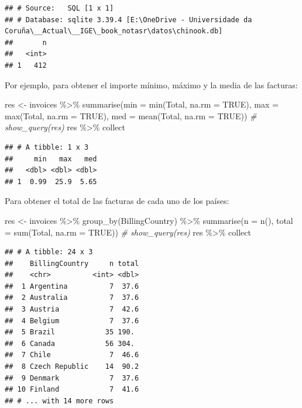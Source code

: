 \documentclass[
]{book}
\newenvironment{Shaded}{\begin{snugshade}}{\end{snugshade}}
\newcommand{\AttributeTok}[1]{\textcolor[rgb]{0.77,0.63,0.00}{#1}}
\newcommand{\CommentTok}[1]{\textcolor[rgb]{0.56,0.35,0.01}{\textit{#1}}}
\newcommand{\ConstantTok}[1]{\textcolor[rgb]{0.00,0.00,0.00}{#1}}
\newcommand{\FunctionTok}[1]{\textcolor[rgb]{0.00,0.00,0.00}{#1}}
\newcommand{\NormalTok}[1]{#1}
\newcommand{\OtherTok}[1]{\textcolor[rgb]{0.56,0.35,0.01}{#1}}
\newcommand{\SpecialCharTok}[1]{\textcolor[rgb]{0.00,0.00,0.00}{#1}}
\theoremstyle{break}
\theoremstyle{nonumberplain}
\begin{document}
\begin{verbatim}
## # Source:   SQL [1 x 1]
## # Database: sqlite 3.39.4 [E:\OneDrive - Universidade da Coruña\__Actual\__IGE\_book_notasr\datos\chinook.db]
##       n
##   <int>
## 1   412
\end{verbatim}

Por ejemplo, para obtener el importe mínimo, máximo y la media de las facturas:

\begin{Shaded}
\begin{Highlighting}[]
\NormalTok{res }\OtherTok{\textless{}{-}}\NormalTok{ invoices }\SpecialCharTok{\%\textgreater{}\%} \FunctionTok{summarise}\NormalTok{(}\AttributeTok{min =} \FunctionTok{min}\NormalTok{(Total, }\AttributeTok{na.rm =} \ConstantTok{TRUE}\NormalTok{), }
                        \AttributeTok{max =} \FunctionTok{max}\NormalTok{(Total, }\AttributeTok{na.rm =} \ConstantTok{TRUE}\NormalTok{), }\AttributeTok{med =} \FunctionTok{mean}\NormalTok{(Total, }\AttributeTok{na.rm =} \ConstantTok{TRUE}\NormalTok{))}
\CommentTok{\# show\_query(res)}
\NormalTok{res  }\SpecialCharTok{\%\textgreater{}\%}\NormalTok{ collect}
\end{Highlighting}
\end{Shaded}

\begin{verbatim}
## # A tibble: 1 x 3
##     min   max   med
##   <dbl> <dbl> <dbl>
## 1  0.99  25.9  5.65
\end{verbatim}

Para obtener el total de las facturas de cada uno de los países:

\begin{Shaded}
\begin{Highlighting}[]
\NormalTok{res }\OtherTok{\textless{}{-}}\NormalTok{ invoices }\SpecialCharTok{\%\textgreater{}\%} \FunctionTok{group\_by}\NormalTok{(BillingCountry) }\SpecialCharTok{\%\textgreater{}\%} 
          \FunctionTok{summarise}\NormalTok{(}\AttributeTok{n =} \FunctionTok{n}\NormalTok{(), }\AttributeTok{total =} \FunctionTok{sum}\NormalTok{(Total, }\AttributeTok{na.rm =} \ConstantTok{TRUE}\NormalTok{))}
\CommentTok{\# show\_query(res)}
\NormalTok{res  }\SpecialCharTok{\%\textgreater{}\%}\NormalTok{ collect}
\end{Highlighting}
\end{Shaded}

\begin{verbatim}
## # A tibble: 24 x 3
##    BillingCountry     n total
##    <chr>          <int> <dbl>
##  1 Argentina          7  37.6
##  2 Australia          7  37.6
##  3 Austria            7  42.6
##  4 Belgium            7  37.6
##  5 Brazil            35 190. 
##  6 Canada            56 304. 
##  7 Chile              7  46.6
##  8 Czech Republic    14  90.2
##  9 Denmark            7  37.6
## 10 Finland            7  41.6
## # ... with 14 more rows
\end{verbatim}
\end{document}

